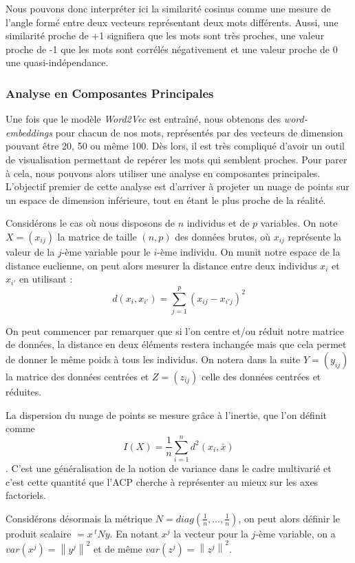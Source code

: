 \documentclass[11pt,french,french]{article}
\begin{document}
Nous pouvons donc interpréter ici la similarité cosinus comme une mesure
de l'angle formé entre deux vecteurs représentant deux mots différents.
Aussi, une similarité proche de +1 signifiera que les mots sont très
proches, une valeur proche de -1 que les mots sont corrélés négativement
et une valeur proche de 0 une quasi-indépendance.

\subsubsection{Analyse en Composantes
Principales}\label{analyse-en-composantes-principales}

Une fois que le modèle \emph{Word2Vec} est entraîné, nous obtenons des
\emph{word-embeddings} pour chacun de nos mots, représentés par des
vecteurs de dimension pouvant être 20, 50 ou même 100. Dès lors, il est
très compliqué d'avoir un outil de visualisation permettant de repérer
les mots qui semblent proches. Pour parer à cela, nous pouvons alors
utiliser une analyse en composantes principales. L'objectif premier de
cette analyse est d'arriver à projeter un nuage de points sur un espace
de dimension inférieure, tout en étant le plus proche de la réalité.

Considérons le cas où nous disposons de \(n\) individus et de \(p\)
variables. On note \(X = (x_{ij})\) la matrice de taille \((n,p)\) des
données brutes, où \(x_{ij}\) représente la valeur de la \(j\)-ème
variable pour le \(i\)-ème individu. On munit notre espace de la
distance euclienne, on peut alors mesurer la distance entre deux
individus \(x_i\) et \(x_{i'}\) en utilisant :
\[d(x_i,x_{i'}) = \sum \limits_{j=1}^p (x_{ij} - x_{i'j})^2 \]

On peut commencer par remarquer que si l'on centre et/ou réduit notre
matrice de données, la distance en deux éléments restera inchangée mais
que cela permet de donner le même poids à tous les individus. On notera
dans la suite \(Y = (y_{ij})\) la matrice des données centrées et
\(Z = (z_{ij})\) celle des données centrées et réduites.

La dispersion du nuage de points se mesure grâce à l'inertie, que l'on
définit comme
\[I(X) = \frac{1}{n} \sum \limits_{i = 1}^n d^2(x_i,\bar{x})\]. C'est
une généralisation de la notion de variance dans le cadre multivarié et
c'est cette quantité que l'ACP cherche à représenter au mieux sur les
axes factoriels.

Considérons désormais la métrique
\(N = diag(\frac{1}{n},...,\frac{1}{n})\), on peut alors définir le
produit scalaire \(<x,y> = x\,^t N y\). En notant \(x^j\) la vecteur
pour la \(j\)-ème variable, on a \(var(x^j) = \left\| y^j \right\|^2\)
et de même \(var(z^j) = \left\| z^j \right\|^2\).
\end{document}
